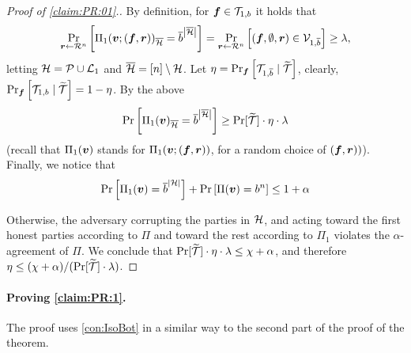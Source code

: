 \begin{proof}[Proof of \cref{claim:PR:01}.]
By definition, for $\vf \in \cT_{1,\o}$ it holds that
\begin{align*}
\ppr{\vr \gets \rn}{\Pi_1(\vv;(\vf,\vr))_\oH = \oo^{\size{\oH}} } = \ppr{\vr \gets \rn}{(\vf,\emptyset,\vr) \in \cV_{1,\oo} } \ge \lambda,
\end{align*}
letting $\cH = \cP \cup \cL_1$ and $\oH = [n] \setminus\cH$. Let $\eta = \ppr{\vf}{\cT_{1,\oo} \mid \tT}$, clearly,	$\ppr{\vf}{\cT_{1,\o} \mid \tT} = 1 -\eta$. By the above
\begin{align}
 \pr{\Pi_1(\vv)_\oH = \oo^{\size{\oH}}} \ge \Pr[\tT]\cdot \eta \cdot \lambda
\end{align}
(recall that $\Pi_1(\vv)$ stands for $\Pi_1(\vv;(\vf,\vr))$, for a random choice of $(\vf,\vr))$).
Finally, we notice that
\begin{align}
\pr{\Pi_1(\vv) = \oo^{\size{\cH}}} + \pr{\Pi(\vv) = \o^n} \le 1+ \alpha
\end{align}

Otherwise, the adversary corrupting the parties in $\cH$, and acting toward the first honest parties according to $\Pi$ and toward the rest according to $\Pi_1$ violates the $\alpha$-agreement of $\Pi$. We conclude that $\Pr[\tT]\cdot \eta \cdot \lambda \le \chi + \alpha $, and therefore $\eta \le (\chi + \alpha)/(\Pr[\tT]\cdot \lambda)$.
 \end{proof}



\paragraph{Proving \cref{claim:PR:1}.}



The proof uses \cref{con:IsoBot} in a similar way to
the second part of the proof of the theorem.


